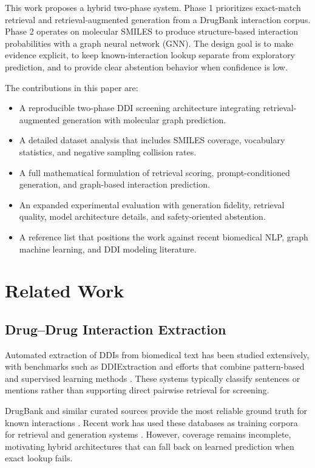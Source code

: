 \documentclass[conference]{IEEEtran}
\begin{document}
This work proposes a hybrid two-phase system. Phase 1 prioritizes exact-match retrieval and retrieval-augmented generation from a DrugBank interaction corpus. Phase 2 operates on molecular SMILES to produce structure-based interaction probabilities with a graph neural network (GNN). The design goal is to make evidence explicit, to keep known-interaction lookup separate from exploratory prediction, and to provide clear abstention behavior when confidence is low.

The contributions in this paper are:
\begin{itemize}
    \item A reproducible two-phase DDI screening architecture integrating retrieval-augmented generation with molecular graph prediction.
    \item A detailed dataset analysis that includes SMILES coverage, vocabulary statistics, and negative sampling collision rates.
    \item A full mathematical formulation of retrieval scoring, prompt-conditioned generation, and graph-based interaction prediction.
    \item An expanded experimental evaluation with generation fidelity, retrieval quality, model architecture details, and safety-oriented abstention.
    \item A reference list that positions the work against recent biomedical NLP, graph machine learning, and DDI modeling literature.
\end{itemize}

\section{Related Work}
\subsection{Drug--Drug Interaction Extraction}
Automated extraction of DDIs from biomedical text has been studied extensively, with benchmarks such as DDIExtraction and efforts that combine pattern-based and supervised learning methods \cite{segura2013ddi, rinaldi2013ddi}. These systems typically classify sentences or mentions rather than supporting direct pairwise retrieval for screening.

DrugBank and similar curated sources provide the most reliable ground truth for known interactions \cite{wishart2018drugbank}. Recent work has used these databases as training corpora for retrieval and generation systems \cite{li2017enhancing, wu2021survey}. However, coverage remains incomplete, motivating hybrid architectures that can fall back on learned prediction when exact lookup fails.
\end{document}
